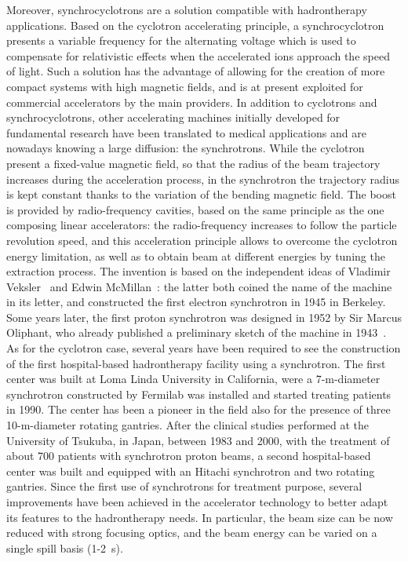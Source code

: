 Moreover, synchrocyclotrons are a solution compatible with hadrontherapy applications. Based on the cyclotron accelerating principle, a synchrocyclotron presents a variable frequency for the alternating voltage which is used to compensate for relativistic effects when the accelerated ions approach the speed of light. Such a solution has the advantage of allowing for the creation of more compact systems with high magnetic fields, and is at present exploited for commercial accelerators by the main providers.  
In addition to cyclotrons and synchrocyclotrons, other accelerating machines  initially developed for fundamental research have been translated to medical applications and are nowadays knowing a large diffusion: the synchrotrons. While the cyclotron present a fixed-value magnetic field, so that the radius of the beam trajectory increases during the acceleration process, in the synchrotron the trajectory radius is kept constant thanks to the variation of the bending magnetic field. The boost is provided by radio-frequency cavities, based on the same principle as the one composing linear accelerators: the radio-frequency increases to follow the particle revolution speed, and this acceleration principle allows to overcome the cyclotron energy limitation, as well as to obtain beam at different energies by tuning the extraction process. The invention is based on the independent ideas of Vladimir Veksler~\parencite{Veksler1944} and Edwin McMillan~\parencite{McMillan1945}: the latter both coined the name of the machine in its letter, and constructed the first electron synchrotron in 1945 in Berkeley. Some years later, the first proton synchrotron was designed in 1952 by Sir Marcus Oliphant, who already published a preliminary sketch of the machine in 1943~\parencite{Oliphant1943}. As for the cyclotron case, several years have been required to see the construction of the first hospital-based hadrontherapy facility using a synchrotron. The first center was built at Loma Linda University in California, were a 7-m-diameter synchrotron constructed by Fermilab was installed and started treating patients in 1990. The center has been a pioneer in the field also for the presence of three 10-m-diameter rotating gantries.  
After the clinical studies performed at the University of Tsukuba, in Japan, between 1983 and 2000, with the treatment of about 700 patients with synchrotron proton beams, a second hospital-based center was built and equipped with an Hitachi synchrotron and two rotating gantries. 
Since the first use of synchrotrons for treatment purpose, several improvements have been achieved in the accelerator technology to better adapt its features to the hadrontherapy needs. In particular, the beam size can be now reduced with strong focusing optics, and the beam energy can be varied on a single spill basis (1-2~s). 
